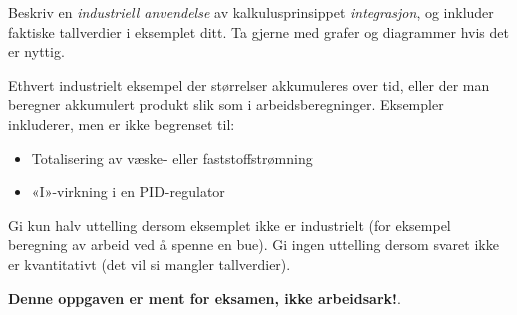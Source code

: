 
Beskriv en {\it industriell anvendelse} av kalkulusprinsippet {\it integrasjon}, og inkluder faktiske tallverdier i eksemplet ditt. Ta gjerne med grafer og diagrammer hvis det er nyttig.

\vskip 100pt







Ethvert industrielt eksempel der størrelser akkumuleres over tid, eller der man beregner akkumulert produkt slik som i arbeidsberegninger. Eksempler inkluderer, men er ikke begrenset til:

\begin{itemize}
\item{} Totalisering av væske- eller faststoffstrømning
\item{} «I»-virkning i en PID-regulator
\end{itemize}

Gi kun halv uttelling dersom eksemplet ikke er industrielt (for eksempel beregning av arbeid ved å spenne en bue). Gi ingen uttelling dersom svaret ikke er kvantitativt (det vil si mangler tallverdier).







{\bf Denne oppgaven er ment for eksamen, ikke arbeidsark!}.

